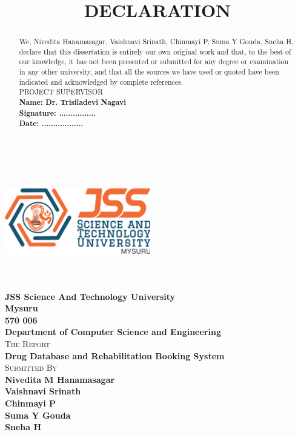 \documentclass{report}
\begin{document}
\begin{titlepage}
\begin{center}
\centerline{\includegraphics[width=2.5in,height=2in,keepaspectratio]{jssstu}}
\Large{\bfseries JSS Science And Technology University}\\
\Large{\bfseries Mysuru}\\
\Large{\bfseries 570 006}\\
[1cm]
\Large{\bfseries Department of Computer Science and Engineering}\\
[1cm]
\textsc{\LARGE The Report}\\
[1cm]	
\huge {\bfseries Drug Database and Rehabilitation Booking System}\\
[1cm]
\textsc{\LARGE Submitted By}\\
\large{\bfseries Nivedita M Hanamasagar}\\
\large{\bfseries Vaishnavi Srinath}\\
\large{\bfseries Chinmayi P}\\
\large{\bfseries Suma Y Gouda}\\
\large{\bfseries Sneha H}\\
\end{center}
\end{titlepage}

\renewcommand{\abstractname}
{\Large DECLARATION}
\title{DECLARATION}
\begin{abstract}
\vspace{1cm}

We, Nivedita Hanamasagar, Vaishnavi Srinath, Chinmayi P, Suma Y Gouda, Sneha H, declare that this dissertation is entirely our own original work and that, to the best of our knowledge, it has not been presented or submitted for any degree or examination in any other university, and that all the sources we have used or quoted have been indicated and acknowledged by complete references.\\
\textsc{\large PROJECT SUPERVISOR}\\
\large{\bfseries Name: Dr. Trisiladevi Nagavi}\\
\large{\bfseries Signature: ................}\\
\large{\bfseries Date: ..................}\\
\end{abstract}
\pagebreak
\end{document}
